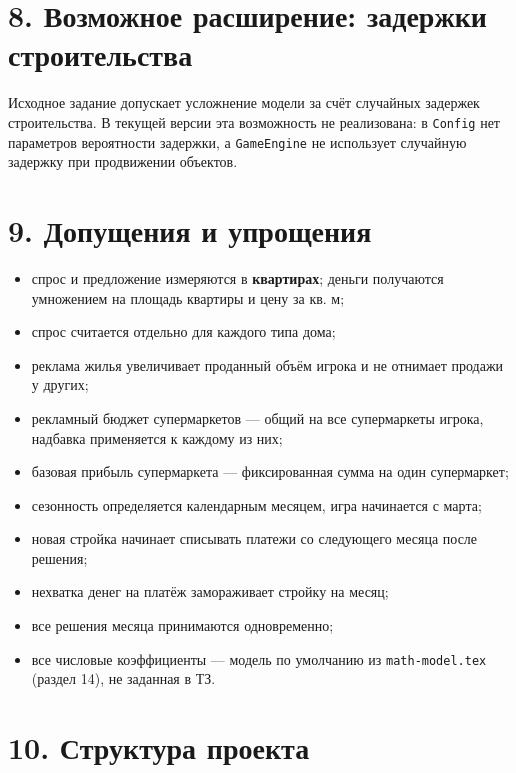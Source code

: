 \documentclass[
]{article}
\providecommand{\tightlist}{%
  \setlength{\itemsep}{0pt}\setlength{\parskip}{0pt}}
\begin{document}
\section{8. Возможное расширение: задержки
строительства}\label{ux43eux43fux446ux438ux43eux43dux430ux43bux44cux43dux43eux435-ux440ux430ux441ux448ux438ux440ux435ux43dux438ux435-ux437ux430ux434ux435ux440ux436ux43aux438-ux441ux442ux440ux43eux438ux442ux435ux43bux44cux441ux442ux432ux430}

Исходное задание допускает усложнение модели за счёт случайных задержек
строительства. В текущей версии эта возможность не реализована: в
\texttt{Config} нет параметров вероятности задержки, а \texttt{GameEngine}
не использует случайную задержку при продвижении объектов.

\section{9. Допущения и
упрощения}\label{ux434ux43eux43fux443ux449ux435ux43dux438ux44f-ux438-ux443ux43fux440ux43eux449ux435ux43dux438ux44f}

\begin{itemize}
\tightlist
\item
  спрос и предложение измеряются в \textbf{квартирах}; деньги получаются
  умножением на площадь квартиры и цену за кв. м;
\item
  спрос считается отдельно для каждого типа дома;
\item
  реклама жилья увеличивает проданный объём игрока и не отнимает продажи
  у других;
\item
  рекламный бюджет супермаркетов --- общий на все супермаркеты игрока,
  надбавка применяется к каждому из них;
\item
  базовая прибыль супермаркета --- фиксированная сумма на один
  супермаркет;
\item
  сезонность определяется календарным месяцем, игра начинается с марта;
\item
  новая стройка начинает списывать платежи со следующего месяца после
  решения;
\item
  нехватка денег на платёж замораживает стройку на месяц;
\item
  все решения месяца принимаются одновременно;
\item
  все числовые коэффициенты --- модель по умолчанию из
  \texttt{math-model.tex} (раздел 14), не заданная в ТЗ.
\end{itemize}

\section{10. Структура
проекта}\label{ux441ux442ux440ux443ux43aux442ux443ux440ux430-ux43fux440ux43eux435ux43aux442ux430}
\end{document}
